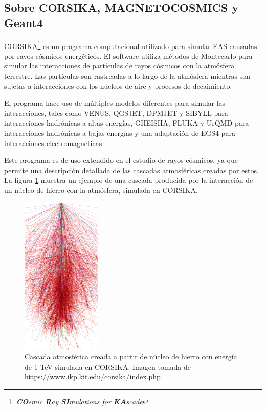 \documentclass[12pt]{report}
\begin{document}

\subsection*{Sobre CORSIKA, MAGNETOCOSMICS y Geant4}

CORSIKA\footnote{\textit{\textbf{CO}smic \textbf{R}ay \textbf{SI}mulations for \textbf{KA}scade}} es un programa computacional utilizado para simular EAS causadas por rayos cósmicos energéticos. El software utiliza métodos de Montecarlo para simular las interacciones de partículas de rayos cósmicos con la atmósfera terrestre. Las partículas son rastreadas a lo largo de la atmósfera mientras son sujetas a interacciones con los núcleos de aire y procesos de decaimiento.

El programa hace uso de múltiples modelos diferentes para simular las interacciones, tales como VENUS, QGSJET, DPMJET y SIBYLL para interacciones hadrónicas a altas energías, GHEISHA, FLUKA y UrQMD para interacciones hadrónicas a bajas energías y una adaptación de EGS4 para interacciones electromagnéticas \cite{heck1998corsika}.

Este programa es de uso extendido en el estudio de rayos cósmicos, ya que permite una descripción detallada de las cascadas atmosféricas creadas por estos. La figura \ref{fig:ironcascade} muestra un ejemplo de una cascada producida por la interacción de un núcleo de hierro con la atmósfera, simulada en CORSIKA.

\begin{figure}
    \centering
    \includegraphics[width=1.5in]{images/ironcascade.png}
    \caption{Cascada atmosférica creada a partir de núcleo de hierro con energía de 1 TeV simulada en CORSIKA. Imagen tomada de \url{https://www.ikp.kit.edu/corsika/index.php}}
    \label{fig:ironcascade}
\end{figure}
\end{document}
